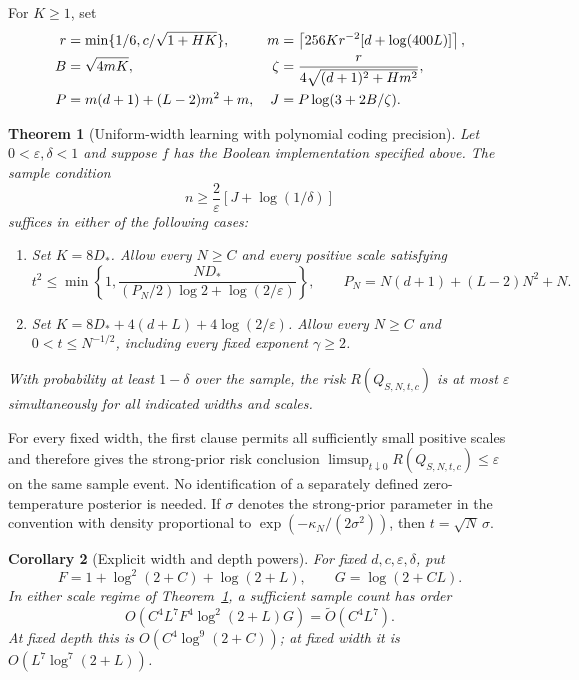 \documentclass[11pt]{article}
\newtheorem{theorem}{Theorem}
\newtheorem{corollary}[theorem]{Corollary}
\begin{document}
For $K\ge1$, set
\begin{align}
 r&=\min\{1/6,c/\sqrt{1+HK}\}, &
 m&=\left\lceil256Kr^{-2}[d+\log(400L)]\right\rceil,\notag\\
 B&=\sqrt{4mK}, &
 \zeta&=\frac r{4\sqrt{(d+1)^2+Hm^2}},\notag\\
 P&=m(d+1)+(L-2)m^2+m, &
 J&=P\log(3+2B/\zeta).
 \label{eq:budget}
\end{align}

\begin{theorem}[Uniform-width learning with polynomial coding precision]
\label{thm:main}
Let $0<\varepsilon,\delta<1$ and suppose $f$ has the Boolean implementation
specified above. The sample condition
\begin{equation}\label{eq:samples}
 n\ge\frac2\varepsilon\left[J+\log(1/\delta)\right]
\end{equation}
suffices in either of the following cases:
\begin{enumerate}
\item Set $K=8D_*$. Allow every $N\ge C$ and every positive scale satisfying
\[
 t^2\le\min\left\{1,
 \frac{ND_*}{(P_N/2)\log2+\log(2/\varepsilon)}\right\},
 \qquad P_N=N(d+1)+(L-2)N^2+N.
\]
\item Set $K=8D_*+4(d+L)+4\log(2/\varepsilon)$. Allow every $N\ge C$
and $0<t\le N^{-1/2}$, including every fixed exponent $\gamma\ge2$.
\end{enumerate}
With probability at least $1-\delta$ over the sample, the risk
$R(Q_{S,N,t,c})$ is at most $\varepsilon$ simultaneously for all indicated
widths and scales.
\end{theorem}

For every fixed width, the first clause permits all sufficiently small
positive scales and therefore gives the strong-prior risk conclusion
$\limsup_{t\downarrow0}R(Q_{S,N,t,c})\le\varepsilon$ on the same sample
event. No identification of a separately defined zero-temperature posterior
is needed. If $\sigma$ denotes the strong-prior parameter in the convention
with density proportional to $\exp(-\kappa_N/(2\sigma^2))$, then
$t=\sqrt N\,\sigma$.

\begin{corollary}[Explicit width and depth powers]\label{cor:powers}
For fixed $d,c,\varepsilon,\delta$, put
\[
 F=1+\log^2(2+C)+\log(2+L),\qquad G=\log(2+CL).
\]
In either scale regime of Theorem~\ref{thm:main}, a sufficient sample
count has order
\begin{equation}\label{eq:joint-rate}
 O\!\left(C^4L^7F^4\log^2(2+L)G\right)
   =\widetilde O(C^4L^7).
\end{equation}
At fixed depth this is $O(C^4\log^9(2+C))$; at fixed width it is
$O(L^7\log^7(2+L))$.
\end{corollary}
\end{document}
